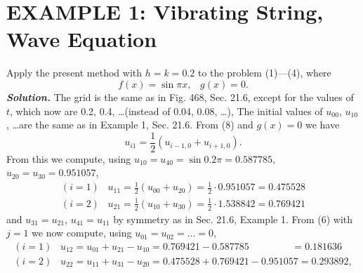 \section*{\small{{\color{blue} EXAMPLE 1:}} Vibrating String, Wave Equation}
Apply the present method with $h=k=0.2$ to the problem (1)---(4), where
\begin{equation*}
f(x)=\sin{\pi x}, \hspace{10pt} g(x)=0.
\end{equation*}
\textit{\textbf{Solution.}} The grid is the same as in Fig. 468, Sec. 21.6, except for the values of $t$, which now are 0.2, 0.4, \dots (instead of 0.04, 0.08, \dots), The initial values of $u_{00}$, $u_{10}$, \dots are the same as in Example 1, Sec. 21.6. From (8) and $g(x)=0$ we have
\begin{equation*}
u_{i1}=\frac{1}{2}(u_{i-1,0}+u_{i+1,0}).
\end{equation*} 
From this we compute, using $u_{10}=u_{40}=\sin{0.2\pi}=0.587785$, $u_{20}=u_{30}=0.951057$,
\begin{equation*}
\begin{split}
(i=1)\hspace{10pt}u_{11}=\frac{1}{2}(u_{00}+u_{20})=\frac{1}{2}\cdot 0.951057=0.475528 \\
(i=2)\hspace{10pt}u_{21}=\frac{1}{2}(u_{10}+u_{30})=\frac{1}{2}\cdot 1.538842=0.769421
\end{split}
\end{equation*}
and $u_{31}=u_{21}$, $u_{41}=u_{11}$ by symmetry as in Sec. 21.6, Example 1. From (6) with $j=1$ we now compute, using $u_{01}=u_{02}=\dots=0$, 
\begin{equation*}
\begin{split}
(i=1)\hspace{10pt}u_{12}=u_{01}+u_{21}-u_{10}=0.769421-0.587785 \hspace{52pt} = 0.181636 \\
(i=2)\hspace{10pt}u_{22}=u_{11}+u_{31}-u_{20}=0.475528+0.769421-0.951057=0.293892,
\end{split}
\end{equation*}
